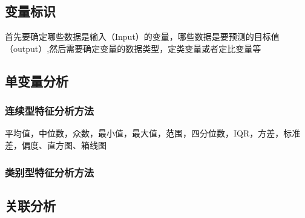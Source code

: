 \subsection{变量标识}
首先要确定哪些数据是输入（Input）的变量，哪些数据是要预测的目标值（output）,然后需要确定变量的数据类型，定类变量或者定比变量等
\subsection{单变量分析}
\subsubsection{连续型特征分析方法}
平均值，中位数，众数，最小值，最大值，范围，四分位数，IQR，方差，标准差，偏度、直方图、箱线图
\subsubsection{类别型特征分析方法}
\subsection{关联分析}
